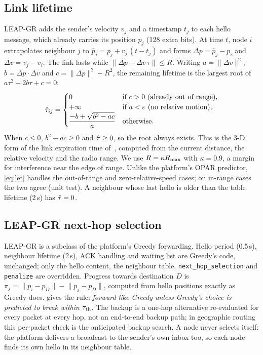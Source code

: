 \subsection{Link lifetime}
\label{sec:let}

LEAP-GR adds the sender's velocity $v_j$ and a timestamp $t_j$ to each hello message, which already carries
its position $p_j$ (128 extra bits). At time $t$, node $i$ extrapolates neighbour $j$ to
$\hat p_j=p_j+v_j\,(t-t_j)$ and forms $\Delta p=\hat p_j-p_i$ and $\Delta v=v_j-v_i$. The link lasts while
$\lVert\Delta p+\Delta v\,\tau\rVert\le R$. Writing $a=\lVert\Delta v\rVert^2$, $b=\Delta p\cdot\Delta v$ and
$c=\lVert\Delta p\rVert^2-R^2$, the remaining lifetime is the largest root of $a\tau^2+2b\tau+c=0$:
\begin{equation}
  \hat{\tau}_{ij}=
  \begin{cases}
    0 & \text{if } c>0 \text{ (already out of range)},\\
    +\infty & \text{if } a<\varepsilon \text{ (no relative motion)},\\
    \dfrac{-b+\sqrt{b^2-ac}}{a} & \text{otherwise.}
  \end{cases}
  \label{eq:let}
\end{equation}
When $c\le0$, $b^2-ac\ge0$ and $\hat{\tau}\ge0$, so the root always exists. This is the 3-D form of the link
expiration time of~\cite{su2001mobility}, computed from the current distance, the relative velocity and the
radio range. We use $R=\kappa R_{\max}$ with $\kappa=0.9$, a margin for interference near the edge of range.
Unlike the platform's OPAR predictor, \eqref{eq:let} handles the out-of-range and zero-relative-speed cases;
on in-range cases the two agree (unit test). A neighbour whose last hello is older than the table lifetime
(2\,s) has $\hat{\tau}=0$.

\subsection{LEAP-GR next-hop selection}
\label{sec:leap}

LEAP-GR is a subclass of the platform's Greedy forwarding. Hello period (0.5\,s), neighbour lifetime (2\,s),
ACK handling and waiting list are Greedy's code, unchanged; only the hello content, the neighbour table,
\texttt{next\_hop\_selection} and \texttt{penalize} are overridden. Progress towards destination $D$ is
$\pi_j=\lVert p_i-p_D\rVert-\lVert p_j-p_D\rVert$, computed from hello positions exactly as Greedy does.
 gives the rule: \emph{forward like Greedy unless Greedy's choice is predicted to break within
$\tau_{\mathrm{th}}$}. The backup is a one-hop alternative re-evaluated for every packet at every hop, not an end-to-end
backup path; in geographic routing this per-packet check is the anticipated backup search. A node never
selects itself: the platform delivers a broadcast to the sender's own inbox too, so each node finds its own
hello in its neighbour table.

